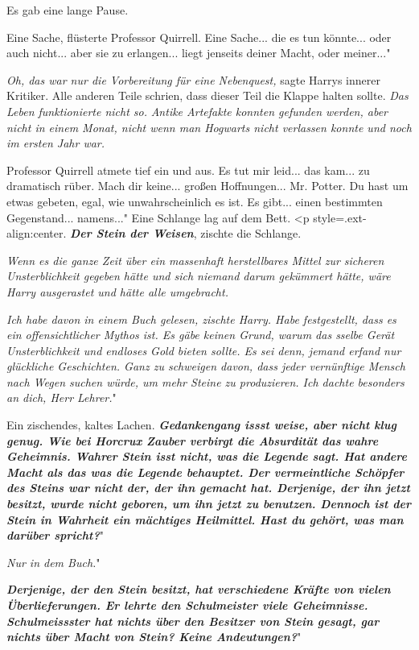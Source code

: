 Es gab eine lange Pause.

\glqq{}Eine Sache\grqq{}, flüsterte Professor Quirrell. \glqq{}Eine Sache... die
es tun könnte... oder auch nicht... aber sie zu erlangen... liegt jenseits
deiner Macht, oder meiner..."

\emph{Oh, das war nur die Vorbereitung für eine Nebenquest,} sagte Harrys
innerer Kritiker. Alle anderen Teile schrien, dass dieser Teil die Klappe halten
sollte. \emph{Das Leben funktionierte nicht so.} \emph{Antike Artefakte konnten
gefunden werden, aber nicht in einem Monat, nicht wenn man Hogwarts nicht
verlassen konnte und noch im ersten Jahr war.}

Professor Quirrell atmete tief ein und aus. \glqq{}Es tut mir leid... das kam...
zu dramatisch rüber. Mach dir keine... großen Hoffnungen... Mr. Potter. Du hast
um etwas gebeten, egal, wie unwahrscheinlich es ist. Es gibt... einen bestimmten
Gegenstand... namens..." Eine Schlange lag auf dem Bett. <p
style=\grqq{}.ext-align:center\grqq{}. \glqq{}\textbf{\emph{Der Stein der
Weisen}}\grqq{}, zischte die Schlange.

\emph{Wenn es die ganze Zeit über ein massenhaft herstellbares Mittel zur
sicheren Unsterblichkeit gegeben hätte und sich niemand darum gekümmert hätte,
wäre Harry ausgerastet und hätte alle umgebracht.}

\glqq{}\emph{Ich habe davon in einem Buch gelesen\grqq{}, zischte Harry. \glqq{}
Habe festgestellt, dass es ein offensichtlicher Mythos ist. Es gäbe keinen
Grund, warum das sselbe Gerät Unsterblichkeit und endloses Gold bieten sollte.
Es sei denn, jemand erfand nur glückliche Geschichten. Ganz zu schweigen davon,
dass jeder vernünftige Mensch nach Wegen suchen würde, um mehr Steine zu
produzieren. Ich dachte besonders an dich, Herr Lehrer.}"

Ein zischendes, kaltes Lachen. \glqq{}\textbf{\emph{Gedankengang issst weise,
aber nicht klug genug. Wie bei Horcrux Zauber verbirgt die Absurdität das wahre
Geheimnis. Wahrer Stein isst nicht, was die Legende sagt. Hat andere Macht als
das was die Legende behauptet. Der vermeintliche Schöpfer des Steins war nicht
der, der ihn gemacht hat. Derjenige, der ihn jetzt besitzt, wurde nicht geboren,
um ihn jetzt zu benutzen. Dennoch ist der Stein in Wahrheit ein mächtiges
Heilmittel. Hast du gehört, was man darüber spricht?}}"

\glqq{}\emph{Nur in dem Buch.}"

\glqq{}\textbf{\emph{Derjenige, der den Stein besitzt, hat verschiedene Kräfte
von vielen Überlieferungen. Er lehrte den Schulmeister viele Geheimnisse.
Schulmeissster hat nichts über den Besitzer von Stein gesagt, gar nichts über
Macht von Stein? Keine Andeutungen?}}"

